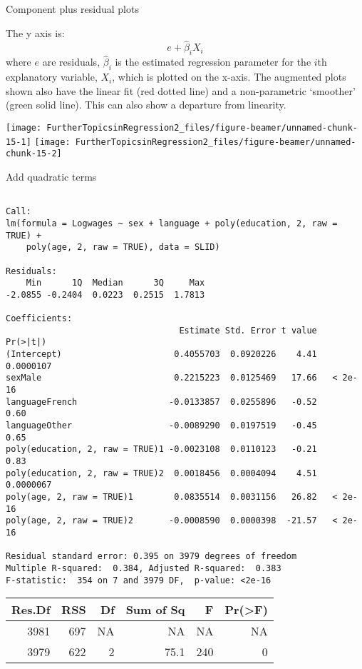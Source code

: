 \documentclass[10pt,ignorenonframetext,]{beamer}
\begin{document}
\begin{frame}{Component plus residual plots}

The y axis is: \[
e + \hat{\beta}_i X_i
\] where \(e\) are residuals, \(\hat{\beta}_i\) is the estimated
regression parameter for the \(i\)th explanatory variable, \(X_i\),
which is plotted on the x-axis. The augmented plots shown also have the
linear fit (red dotted line) and a non-parametric `smoother' (green
solid line). This can also show a departure from linearity.

\texttt{[image: FurtherTopicsinRegression2\_files/figure-beamer/unnamed-chunk-15-1]}
\texttt{[image: FurtherTopicsinRegression2\_files/figure-beamer/unnamed-chunk-15-2]}

\end{frame}

\begin{frame}[fragile]{Add quadratic terms}

\tiny

\begin{verbatim}

Call:
lm(formula = Logwages ~ sex + language + poly(education, 2, raw = TRUE) + 
    poly(age, 2, raw = TRUE), data = SLID)

Residuals:
    Min      1Q  Median      3Q     Max 
-2.0855 -0.2404  0.0223  0.2515  1.7813 

Coefficients:
                                  Estimate Std. Error t value  Pr(>|t|)
(Intercept)                      0.4055703  0.0920226    4.41 0.0000107
sexMale                          0.2215223  0.0125469   17.66   < 2e-16
languageFrench                  -0.0133857  0.0255896   -0.52      0.60
languageOther                   -0.0089290  0.0197519   -0.45      0.65
poly(education, 2, raw = TRUE)1 -0.0023108  0.0110123   -0.21      0.83
poly(education, 2, raw = TRUE)2  0.0018456  0.0004094    4.51 0.0000067
poly(age, 2, raw = TRUE)1        0.0835514  0.0031156   26.82   < 2e-16
poly(age, 2, raw = TRUE)2       -0.0008590  0.0000398  -21.57   < 2e-16

Residual standard error: 0.395 on 3979 degrees of freedom
Multiple R-squared:  0.384, Adjusted R-squared:  0.383 
F-statistic:  354 on 7 and 3979 DF,  p-value: <2e-16
\end{verbatim}

\begin{longtable}[]{@{}rrrrrr@{}}
\toprule
Res.Df & RSS & Df & Sum of Sq & F & Pr(\textgreater{}F)\tabularnewline
\midrule
\endhead
3981 & 697 & NA & NA & NA & NA\tabularnewline
3979 & 622 & 2 & 75.1 & 240 & 0\tabularnewline
\bottomrule
\end{longtable}

\end{frame}
\end{document}
